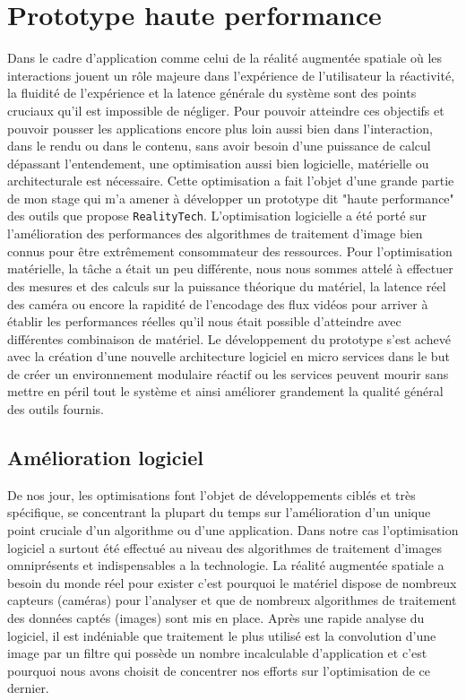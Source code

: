 \chapter{Prototype haute performance}
\label{chap:protoHP}

Dans le cadre d'application comme celui de la réalité augmentée spatiale où les interactions jouent un rôle majeure dans l'expérience de l'utilisateur la réactivité, la fluidité de l'expérience et la latence générale du système sont des points cruciaux qu'il est impossible de négliger. Pour pouvoir atteindre ces objectifs et pouvoir pousser les applications encore plus loin aussi bien dans l'interaction, dans le rendu ou dans le contenu, sans avoir besoin d'une puissance de calcul dépassant l'entendement, une optimisation aussi bien logicielle, matérielle ou architecturale est nécessaire. Cette optimisation a fait l'objet d'une grande partie de mon stage qui m'a amener à développer un prototype dit "haute performance" des outils que propose \texttt{RealityTech}. L'optimisation logicielle a été porté sur l'amélioration des performances des algorithmes de traitement d'image bien connus pour être extrêmement consommateur des ressources. Pour l'optimisation matérielle, la tâche a était un peu différente, nous nous sommes attelé à effectuer des mesures et des calculs sur la puissance théorique du matériel, la latence réel des caméra ou encore la rapidité de l'encodage des flux vidéos pour arriver à établir les performances réelles qu'il nous était possible d'atteindre avec différentes combinaison de matériel. Le développement du prototype s'est achevé avec la création d'une nouvelle architecture logiciel en micro services dans le but de créer un environnement modulaire réactif ou les services peuvent mourir sans mettre en péril tout le système et ainsi améliorer grandement la qualité général des outils fournis.

\section{Amélioration logiciel}
\label{sec:hpsoft}
De nos jour, les optimisations font l'objet de développements ciblés et très spécifique, se concentrant la plupart du temps sur l'amélioration d'un unique point cruciale d'un algorithme ou d'une application. Dans notre cas l'optimisation logiciel a surtout été effectué au niveau des algorithmes de traitement d'images omniprésents et indispensables a la technologie. La réalité augmentée spatiale a besoin du monde réel pour exister c'est pourquoi le matériel dispose de nombreux capteurs (caméras) pour l'analyser et que de nombreux algorithmes de traitement des données captés (images) sont mis en place. Après une rapide analyse du logiciel, il est indéniable que traitement le plus utilisé est la convolution d'une image par un filtre qui possède un nombre incalculable d'application et c'est pourquoi nous avons choisit de concentrer nos efforts sur l'optimisation de ce dernier.

